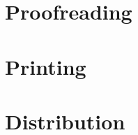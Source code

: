 \documentclass{book}
\begin{document}
\chapter{Proofreading}
\chapter{Printing}
\chapter{Distribution}

\cleardoublepage
\printbibliography[heading=bibintoc]

\cleardoublepage
{}
\printacronyms[heading=none]

\def\index#1{} %
\printindex    %
\end{document}
